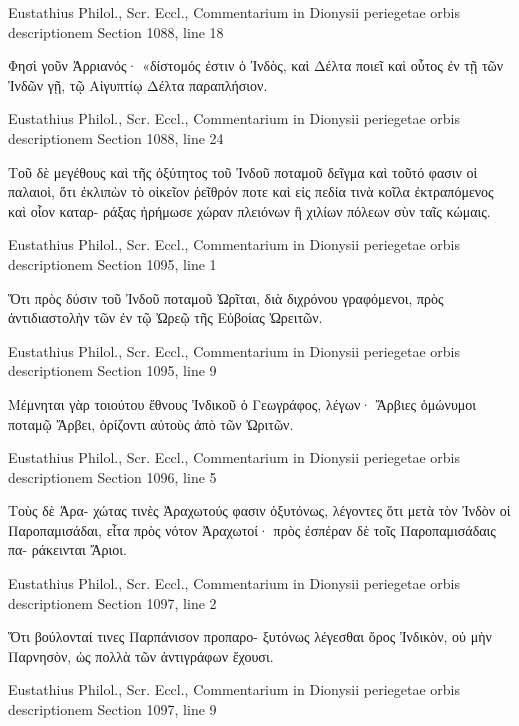 \documentclass[12pt,letterpaper,twoside,final]{memoir}
\begin{document}
\begin{greek}
Eustathius Philol., Scr. Eccl., Commentarium in Dionysii periegetae orbis descriptionem 
Section 1088, line 18

                                               Φησὶ γοῦν 
Ἀρριανός· «δίστομός ἐστιν ὁ Ἰνδὸς, καὶ Δέλτα ποιεῖ 
καὶ οὗτος ἐν τῇ τῶν Ἰνδῶν γῇ, τῷ Αἰγυπτίῳ Δέλτα 
παραπλήσιον. 



Eustathius Philol., Scr. Eccl., Commentarium in Dionysii periegetae orbis descriptionem 
Section 1088, line 24

                                 Τοῦ δὲ μεγέθους καὶ 
τῆς ὀξύτητος τοῦ Ἰνδοῦ ποταμοῦ δεῖγμα καὶ τοῦτό 
φασιν οἱ παλαιοὶ, ὅτι ἐκλιπὼν τὸ οἰκεῖον ῥεῖθρόν ποτε 
καὶ εἰς πεδία τινὰ κοῖλα ἐκτραπόμενος καὶ οἷον καταρ-
ράξας ἠρήμωσε χώραν πλειόνων ἢ χιλίων πόλεων σὺν 
ταῖς κώμαις. 



Eustathius Philol., Scr. Eccl., Commentarium in Dionysii periegetae orbis descriptionem 
Section 1095, line 1

Ὅτι πρὸς δύσιν τοῦ Ἰνδοῦ ποταμοῦ Ὠρῖται, 
διὰ διχρόνου γραφόμενοι, πρὸς ἀντιδιαστολὴν τῶν ἐν 
τῷ Ὠρεῷ τῆς Εὐβοίας Ὠρειτῶν. 



Eustathius Philol., Scr. Eccl., Commentarium in Dionysii periegetae orbis descriptionem 
Section 1095, line 9

                       Μέμνηται γὰρ τοιούτου ἔθνους Ἰνδικοῦ 
ὁ Γεωγράφος, λέγων· Ἄρβιες ὁμώνυμοι ποταμῷ Ἄρβει, 
ὁρίζοντι αὐτοὺς ἀπὸ τῶν Ὠριτῶν. 



Eustathius Philol., Scr. Eccl., Commentarium in Dionysii periegetae orbis descriptionem 
Section 1096, line 5

                                                 Τοὺς δὲ Ἀρα-
χώτας τινὲς Ἀραχωτούς φασιν ὀξυτόνως, λέγοντες ὅτι 
μετὰ τὸν Ἰνδὸν οἱ Παροπαμισάδαι, εἶτα πρὸς νότον 
Ἀραχωτοί· πρὸς ἐσπέραν δὲ τοῖς Παροπαμισάδαις πα-
ράκεινται Ἄριοι. 



Eustathius Philol., Scr. Eccl., Commentarium in Dionysii periegetae orbis descriptionem 
Section 1097, line 2

Ὅτι βούλονταί τινες Παρπάνισον προπαρο-
ξυτόνως λέγεσθαι ὄρος Ἰνδικὸν, οὐ μὴν Παρνησὸν, ὡς 
πολλὰ τῶν ἀντιγράφων ἔχουσι. 



Eustathius Philol., Scr. Eccl., Commentarium in Dionysii periegetae orbis descriptionem 
Section 1097, line 9


\end{greek}
\end{document}
